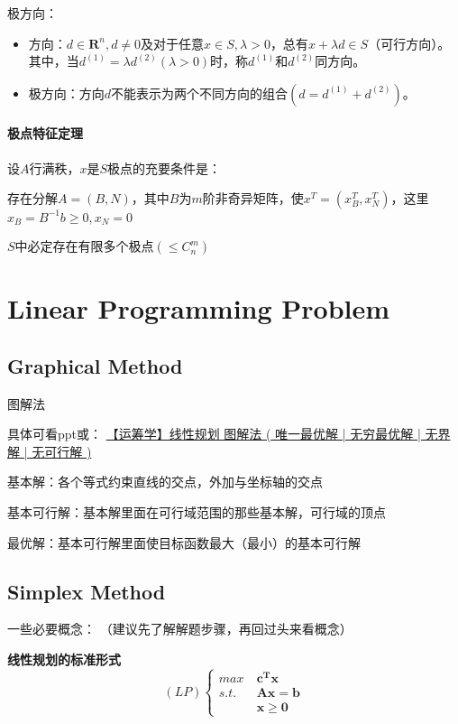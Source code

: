 \documentclass{book}
\begin{document}
极方向：
\begin{itemize}
    \item 方向：$d\in \boldsymbol{R}^n, d\ne 0$及对于任意$x\in S,\lambda>0$，总有$x+\lambda d\in S$（可行方向）。其中，当$d^{(1)}=\lambda d^{(2)}(\lambda>0)$时，称$d^{(1)}$和$d^{(2)}$同方向。
    \item 极方向：方向$d$不能表示为两个不同方向的组合$(d=d^{(1)}+d^{(2)})$。
\end{itemize}

\subsubsection{极点特征定理}

设$A$行满秩，$x$是$S$极点的充要条件是：

存在分解$A=(B,N)$，其中$B$为$m$阶非奇异矩阵，使$x^T=(x_B^T,x_N^T)$，这里$x_B=B^{-1}b\ge0,x_N=0$

$S$中必定存在有限多个极点$(\le C_n^m)$

\chapter{Linear Programming Problem}

\section{Graphical Method}
图解法

具体可看ppt或：
\href{https://blog.csdn.net/shulianghan/article/details/102671536}{【运筹学】线性规划 图解法 ( 唯一最优解 | 无穷最优解 | 无界解 | 无可行解 )}

基本解：各个等式约束直线的交点，外加与坐标轴的交点

基本可行解：基本解里面在可行域范围的那些基本解，可行域的顶点

最优解：基本可行解里面使目标函数最大（最小）的基本可行解


\section{Simplex Method}

一些必要概念：
（建议先了解解题步骤，再回过头来看概念）

\textbf{线性规划的标准形式}
\begin{equation}
(LP)
    \begin{cases}
        max\ &\boldsymbol{c^Tx}\\
        s.t. &\boldsymbol{Ax}=\boldsymbol{b}\\
            &\boldsymbol{x\ge0}
    \end{cases}
    \label{con:standard form of LP}
\end{equation}
\end{document}
